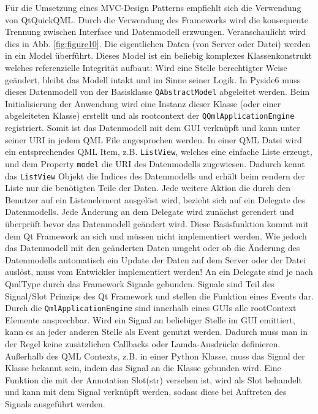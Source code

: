 Für die Umsetzung eines MVC-Design Patterns empfiehlt sich die Verwendung von QtQuickQML.
Durch die Verwendung des Frameworks wird die konsequente Trennung zwischen Interface und Datenmodell erzwungen.
Veranschaulicht wird dies in Abb. \ref{fig:figure10}.
Die eigentlichen Daten (von Server oder Datei) werden in ein Model überführt.
Dieses Model ist ein beliebig komplexes Klassenkonstrukt welches referenzielle Integrität aufbaut: Wird eine Stelle
berechtigter Weise geändert, bleibt das Modell intakt und im Sinne seiner Logik.
In Pyside6 muss dieses Datenmodell von der Basisklasse \verb|QAbstractModel| abgeleitet werden.
Beim Initialisierung der Anwendung wird eine Instanz dieser Klasse (oder einer abgeleiteten Klasse) erstellt und als
rootcontext der \verb|QQmlApplicationEngine| registriert.
Somit ist das Datenmodell mit dem GUI verknüpft und kann unter seiner URI in jedem QML File angesprochen werden.
In einer QML Datei wird ein entsprechendes QML Item, z.B. \verb|ListView|, welches eine einfache Liste erzeugt,
und dem Property \verb|model| die URI des Datenmodells zugewiesen.
Dadurch kennt das \verb|ListView| Objekt die Indices des Datenmodells und erhält beim rendern der Liste nur die benötigten
Teile der Daten.
Jede weitere Aktion die durch den Benutzer auf ein Listenelement ausgelöst wird, bezieht sich auf ein Delegate des Datenmodells.
Jede Änderung an dem Delegate wird zunächst gerendert und überprüft bevor das Datenmodell geändert wird.
Diese Basisfunktion kommt mit dem Qt Framework an sich und müssen nicht implementiert werden.
Wie jedoch das Datenmodell mit den geänderten Daten umgeht oder ob die Änderung des Datenmodells automatisch ein Update
der Daten auf dem Server oder der Datei auslöst, muss vom Entwickler implementiert werden!
An ein Delegate sind je nach QmlType durch das Framework Signale gebunden.
Signale sind Teil des Signal/Slot Prinzips des Qt Framework \cite{pysideSignalSlot} und stellen die Funktion eines Events dar.
Durch die \verb|QmlApplicationEngine| sind innerhalb eines GUIs alle rootContext Elemente ansprechbar.
Wird ein Signal an beliebiger Stelle im GUI emittiert, kann es an jeder anderen Stelle als Event genutzt werden.
Dadurch muss man  in der Regel keine zusätzlichen Callbacks oder Lamda-Ausdrücke definieren.
Außerhalb des QML Contexts, z.B. in einer Python Klasse, muss das Signal der Klasse bekannt sein, indem das Signal an die Klasse
gebunden wird.
Eine Funktion die mit der Annotation \glqq Slot(str) \grqq versehen ist, wird als Slot behandelt und kann mit dem Signal
verknüpft werden, sodass diese bei Auftreten des Signals ausgeführt werden.

